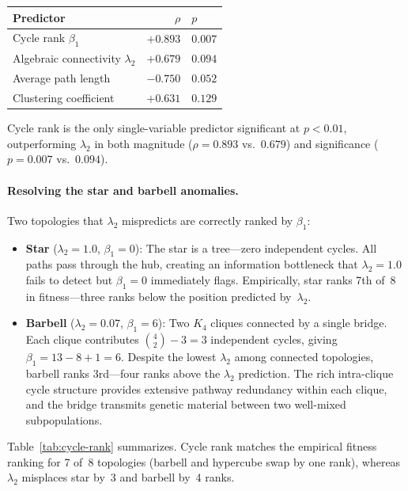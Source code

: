 \begin{center}
\small
\begin{tabular}{@{}lrl@{}}
\toprule
\textbf{Predictor} & \textbf{$\rho$} & \textbf{$p$} \\
\midrule
Cycle rank $\beta_1$ & $\mathbf{+0.893}$ & $\mathbf{0.007}$ \\
Algebraic connectivity $\lambda_2$ & $+0.679$ & $0.094$ \\
Average path length & $-0.750$ & $0.052$ \\
Clustering coefficient & $+0.631$ & $0.129$ \\
\bottomrule
\end{tabular}
\end{center}

\noindent Cycle rank is the only single-variable predictor significant
at $p < 0.01$, outperforming $\lambda_2$ in both magnitude
($\rho = 0.893$ vs.\ $0.679$) and significance ($p = 0.007$ vs.\
$0.094$).

\paragraph{Resolving the star and barbell anomalies.}
Two topologies that $\lambda_2$ mispredicts are correctly ranked by
$\beta_1$:

\begin{itemize}[nosep]
  \item \textbf{Star} ($\lambda_2 = 1.0$, $\beta_1 = 0$):  The star
    is a tree---zero independent cycles.  All paths pass through the
    hub, creating an information bottleneck that $\lambda_2 = 1.0$
    fails to detect but $\beta_1 = 0$ immediately flags.  Empirically,
    star ranks 7th of~8 in fitness---three ranks below the position
    predicted by~$\lambda_2$.

  \item \textbf{Barbell} ($\lambda_2 = 0.07$, $\beta_1 = 6$):  Two
    $K_4$ cliques connected by a single bridge.  Each clique
    contributes $\binom{4}{2} - 3 = 3$ independent cycles, giving
    $\beta_1 = 13 - 8 + 1 = 6$.  Despite the lowest $\lambda_2$ among
    connected topologies, barbell ranks 3rd---four ranks above the
    $\lambda_2$ prediction.  The rich intra-clique cycle structure
    provides extensive pathway redundancy within each clique, and the
    bridge transmits genetic material between two well-mixed
    subpopulations.
\end{itemize}

Table~\ref{tab:cycle-rank} summarizes.  Cycle rank matches the
empirical fitness ranking for 7 of~8 topologies (barbell and hypercube
swap by one rank), whereas $\lambda_2$ misplaces star by~3 and barbell
by~4 ranks.

